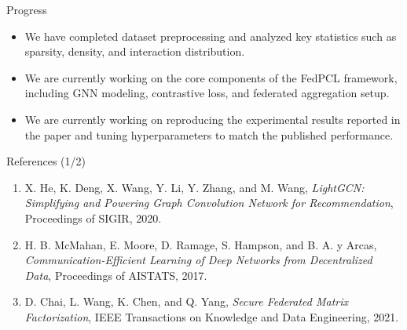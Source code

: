 \documentclass{beamer}
\begin{document}
\begin{frame}{Progress}
\begin{itemize}

  \item We have completed dataset preprocessing and analyzed key statistics such as sparsity, density, and interaction distribution.

  \item We are currently working on the core components of the FedPCL framework, including GNN modeling, contrastive loss, and federated aggregation setup.

  \item We are currently working on reproducing the experimental results reported in the paper and tuning hyperparameters to match the published performance.

\end{itemize}
\end{frame}



\begin{frame}{References (1/2)}
\small

\begin{enumerate}

  \item \hypertarget{ref:lightgcn}{}
  X. He, K. Deng, X. Wang, Y. Li, Y. Zhang, and M. Wang,
  \emph{LightGCN: Simplifying and Powering Graph Convolution Network
  for Recommendation},
  Proceedings of SIGIR, 2020.

  \item \hypertarget{ref:fedavg}{}
  H. B. McMahan, E. Moore, D. Ramage, S. Hampson, and B. A. y Arcas,
  \emph{Communication-Efficient Learning of Deep Networks from
  Decentralized Data},
  Proceedings of AISTATS, 2017.

  \item \hypertarget{ref:fedmf}{}
  D. Chai, L. Wang, K. Chen, and Q. Yang,
  \emph{Secure Federated Matrix Factorization},
  IEEE Transactions on Knowledge and Data Engineering, 2021.

\end{enumerate}

\end{frame}
\end{document}
